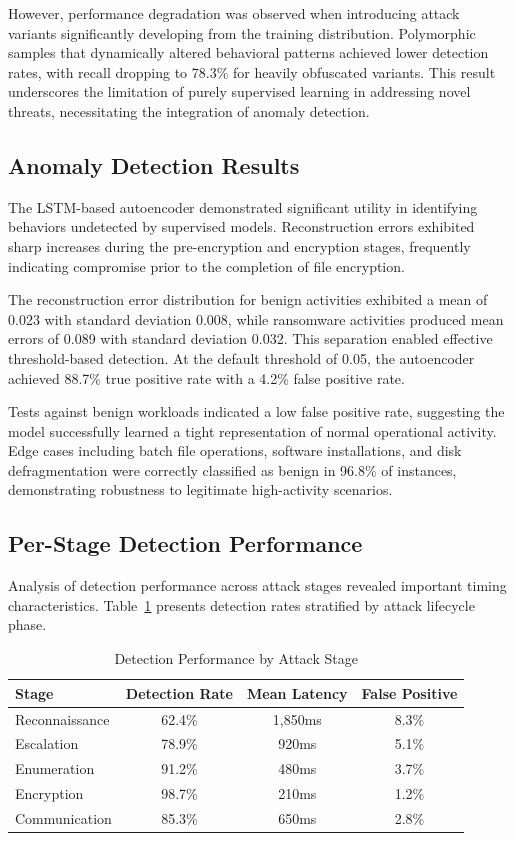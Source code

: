 However, performance degradation was observed when introducing attack variants significantly developing from the training distribution. Polymorphic samples that dynamically altered behavioral patterns achieved lower detection rates, with recall dropping to 78.3\% for heavily obfuscated variants. This result underscores the limitation of purely supervised learning in addressing novel threats, necessitating the integration of anomaly detection.

\subsection{Anomaly Detection Results}

The LSTM-based autoencoder demonstrated significant utility in identifying behaviors undetected by supervised models. Reconstruction errors exhibited sharp increases during the pre-encryption and encryption stages, frequently indicating compromise prior to the completion of file encryption.

The reconstruction error distribution for benign activities exhibited a mean of 0.023 with standard deviation 0.008, while ransomware activities produced mean errors of 0.089 with standard deviation 0.032. This separation enabled effective threshold-based detection. At the default threshold of 0.05, the autoencoder achieved 88.7\% true positive rate with a 4.2\% false positive rate.

Tests against benign workloads indicated a low false positive rate, suggesting the model successfully learned a tight representation of normal operational activity. Edge cases including batch file operations, software installations, and disk defragmentation were correctly classified as benign in 96.8\% of instances, demonstrating robustness to legitimate high-activity scenarios.

\subsection{Per-Stage Detection Performance}

Analysis of detection performance across attack stages revealed important timing characteristics. Table~\ref{tab:stage_detection} presents detection rates stratified by attack lifecycle phase.

\begin{table}[t]
\centering
\caption{Detection Performance by Attack Stage}
\label{tab:stage_detection}
\begin{tabular}{lccc}
\hline
\textbf{Stage} & \textbf{Detection Rate} & \textbf{Mean Latency} & \textbf{False Positive} \\
\hline
Reconnaissance & 62.4\% & 1,850ms & 8.3\% \\
Escalation & 78.9\% & 920ms & 5.1\% \\
Enumeration & 91.2\% & 480ms & 3.7\% \\
Encryption & 98.7\% & 210ms & 1.2\% \\
Communication & 85.3\% & 650ms & 2.8\% \\
\hline
\end{tabular}
\end{table}

